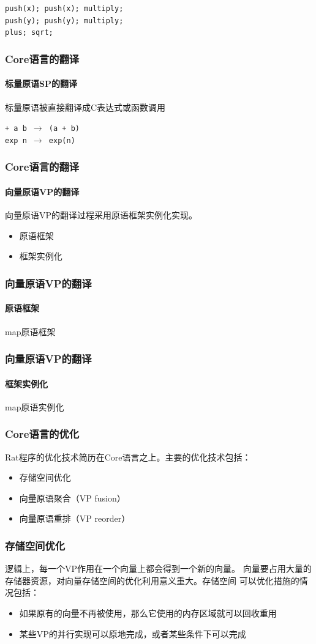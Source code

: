 \documentclass{beamer}
\begin{document}
\begin{frame}[t]
{    \texttt{push(x); push(x); multiply;\\push(y); push(y); multiply;\\plus; sqrt;}
  }
\end{frame}

\begin{frame}
  \frametitle{Core语言的翻译}
  \framesubtitle{标量原语SP的翻译}
  标量原语被直接翻译成C表达式或函数调用

  \texttt{+ a b $\rightarrow$  (a + b)}\\
  \texttt{exp n $\rightarrow$ exp(n)}
\end{frame}

\begin{frame}
  \frametitle{Core语言的翻译}
  \framesubtitle{向量原语VP的翻译}
  向量原语VP的翻译过程采用原语框架实例化实现。
  \begin{itemize}
    \item 原语框架
    \item 框架实例化
  \end{itemize}
\end{frame}

\begin{frame}
  \frametitle{向量原语VP的翻译}
  \framesubtitle{原语框架}
  map原语框架
  
\end{frame}

\begin{frame}
  \frametitle{向量原语VP的翻译}
  \framesubtitle{框架实例化}
  map原语实例化
  
\end{frame}

\begin{frame}
  \frametitle{Core语言的优化}
  Rat程序的优化技术简历在Core语言之上。主要的优化技术包括：
  \begin{itemize}
    \item 存储空间优化
    \item 向量原语聚合（VP fusion）
    \item 向量原语重排（VP reorder）
  \end{itemize}
\end{frame}

\begin{frame}
  \frametitle{存储空间优化}
  逻辑上，每一个VP作用在一个向量上都会得到一个新的向量。
  向量要占用大量的存储器资源，对向量存储空间的优化利用意义重大。存储空间
  可以优化措施的情况包括：
  \pause
  \begin{itemize}
    \item 如果原有的向量不再被使用，那么它使用的内存区域就可以回收重用
    \item 某些VP的并行实现可以原地完成，或者某些条件下可以完成
  \end{itemize}
\end{frame}
\end{document}

